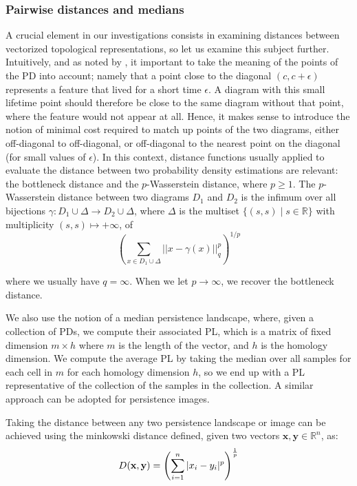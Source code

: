 \documentclass{article}
\begin{document}
\subsubsection{Pairwise distances and medians}

A crucial element in our investigations consists in examining distances between vectorized
topological representations, so let us examine this subject further. Intuitively, and as noted by
\citep{berwald2018computing}, it important to take the meaning of the points of the PD into account;
namely that a point close to the diagonal $(c,c+\epsilon)$ represents a feature that lived for a
short time $\epsilon$. A diagram with this small lifetime point should therefore be close to the
same diagram without that point, where the feature would not appear at all. Hence, it makes sense to
introduce the notion of minimal cost required to match up points of the two diagrams, either
off-diagonal to off-diagonal, or off-diagonal to the nearest point on the diagonal (for small values
of $\epsilon$). In this context, distance functions usually applied to evaluate the distance between
two probability density estimations are relevant: the bottleneck distance and the $p$-Wasserstein
distance, where $p\geq 1$. The $p$-Wasserstein distance between two diagrams $D_1$ and $D_2$ is the
infimum over all bijections $\gamma: D_1 \cup \Delta \to D_2 \cup \Delta$, where $\Delta$ is the
multiset $\lbrace (s, s) \mid s \in \mathbb{R} \rbrace$ with multiplicity $(s,s) \mapsto +\infty$,
of
\begin{equation}
  \label{eq:wasserstein_distance}
  \left(\sum_{x \in D_1 \cup \Delta} ||x - \gamma(x)||_q^p \right)^{1/p}
\end{equation}

where we usually have $q=\infty$. When we let $p\to\infty$, we recover the bottleneck distance.

We also use the notion of a median persistence landscape, where, given a collection of PDs, we
compute their associated PL, which is a matrix of fixed dimension $m\times h$ where $m$ is the
length of the vector, and $h$ is the homology dimension. We compute the average PL by taking the
median over all samples for each cell in $m$ for each homology dimension $h$, so we end up with a PL
representative of the collection of the samples in the collection. A similar approach can be adopted
for persistence images.

Taking the distance between any two persistence landscape or image can be achieved using the
minkowski distance defined, given two vectors $\mathbf{x},\mathbf{y}\in\mathbb{R}^n$, as:
\begin{equation}
  \label{eq:minkowski}
  D(\mathbf{x},\mathbf{y}) = \left(\sum_{i=1}^{n}|x_i-y_i|^p\right)^{1\over p}
\end{equation}
\end{document}
